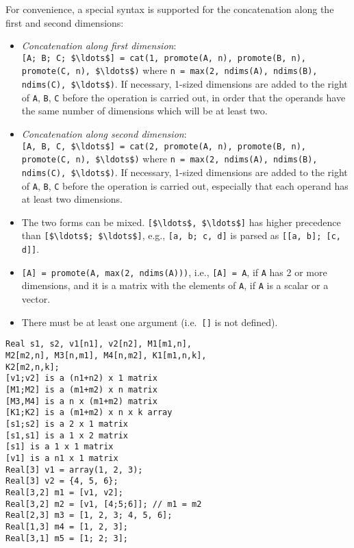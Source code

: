 For convenience, a special syntax is supported for the concatenation along the first and second dimensions:
\begin{itemize}
\item
  \emph{Concatenation along first dimension}:\\
  \lstinline![A; B; C; $\ldots$] = cat(1, promote(A, n), promote(B, n), promote(C, n), $\ldots$)!
  where \lstinline!n = max(2, ndims(A), ndims(B), ndims(C), $\ldots$)!.  If necessary, 1-sized
  dimensions are added to the right of \lstinline!A!, \lstinline!B!, \lstinline!C! before the operation is
  carried out, in order that the operands have the same number of dimensions which will be at least two.
\item
  \emph{Concatenation along second dimension}:\\
  \lstinline![A, B, C, $\ldots$] = cat(2, promote(A, n), promote(B, n), promote(C, n), $\ldots$)!
  where \lstinline!n = max(2, ndims(A), ndims(B), ndims(C), $\ldots$)!.  If necessary, 1-sized
  dimensions are added to the right of \lstinline!A!, \lstinline!B!, \lstinline!C! before the operation is
  carried out, especially that each operand has at least two dimensions.
\item
  The two forms can be mixed.  \lstinline![$\ldots$, $\ldots$]! has higher precedence than
  \lstinline![$\ldots$; $\ldots$]!, e.g., \lstinline![a, b; c, d]! is parsed as \lstinline![[a, b]; [c, d]]!.
\item
  \lstinline![A] = promote(A, max(2, ndims(A)))!, i.e., \lstinline![A] = A!, if \lstinline!A! has 2 or more dimensions, and it is a matrix
  with the elements of \lstinline!A!, if \lstinline!A! is a scalar or a vector.
\item
  There must be at least one argument (i.e.\ \lstinline![]! is not defined).
\end{itemize}

\begin{example}
\begin{lstlisting}[language=modelica]
Real s1, s2, v1[n1], v2[n2], M1[m1,n],
M2[m2,n], M3[n,m1], M4[n,m2], K1[m1,n,k],
K2[m2,n,k];
[v1;v2] is a (n1+n2) x 1 matrix
[M1;M2] is a (m1+m2) x n matrix
[M3,M4] is a n x (m1+m2) matrix
[K1;K2] is a (m1+m2) x n x k array
[s1;s2] is a 2 x 1 matrix
[s1,s1] is a 1 x 2 matrix
[s1] is a 1 x 1 matrix
[v1] is a n1 x 1 matrix
Real[3] v1 = array(1, 2, 3);
Real[3] v2 = {4, 5, 6};
Real[3,2] m1 = [v1, v2];
Real[3,2] m2 = [v1, [4;5;6]]; // m1 = m2
Real[2,3] m3 = [1, 2, 3; 4, 5, 6];
Real[1,3] m4 = [1, 2, 3];
Real[3,1] m5 = [1; 2; 3];
\end{lstlisting}
\end{example}

